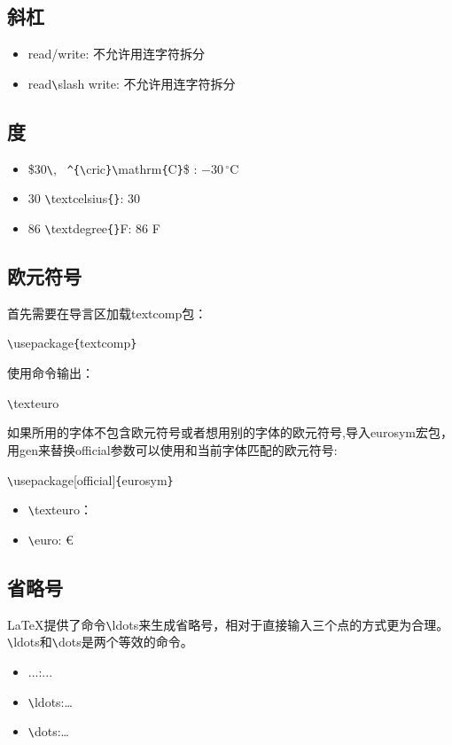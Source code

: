 \documentclass[UTF8]{ctexart}
\begin{document}
\subsection{斜杠}
\begin{itemize}
  \item read/write: 不允许用连字符拆分
  \item read\texttt{\textbackslash}slash write: 不允许用连字符拆分
\end{itemize}
\subsection{度}
\begin{itemize}
  \item \$30\texttt{\textbackslash}, \texttt{~\^}\texttt{\{}\texttt{\textbackslash}cric\texttt{\}}\texttt{\textbackslash}mathrm\texttt{\{}C\texttt{\}}\$ :
$-30\,^{\circ}\mathrm{C}$
  \item 30 \texttt{\textbackslash}textcelsius\texttt{\{}\texttt{\}}: 30 \textcelsius{}
  \item 86 \texttt{\textbackslash}textdegree\texttt{\{}\texttt{\}}F: 86 \textdegree{}F
\end{itemize}
\subsection{欧元符号}
 首先需要在导言区加载textcomp包：

 \texttt{\textbackslash}usepackage\texttt{\{}textcomp\texttt{\}}

 使用命令输出：

 \texttt{\textbackslash}texteuro

 如果所用的字体不包含欧元符号或者想用别的字体的欧元符号,导入eurosym宏包，用gen来替换official参数可以使用和当前字体匹配的欧元符号:

 \texttt{\textbackslash}usepackage[official]\texttt{\{}eurosym\texttt{\}}
 \begin{itemize}
  \item \texttt{\textbackslash}texteuro：\texteuro
  \item \texttt{\textbackslash}euro: \euro
\end{itemize}
\subsection{省略号}
\LaTeX 提供了命令\texttt{\textbackslash}ldots来生成省略号，相对于直接输入三个点的方式更为合理。\texttt{\textbackslash}ldots和\texttt{\textbackslash}dots是两个等效的命令。
\begin{itemize}
  \item ...:...
  \item \texttt{\textbackslash}ldots:\ldots
  \item \texttt{\textbackslash}dots:\dots
\end{itemize}
\end{document}
